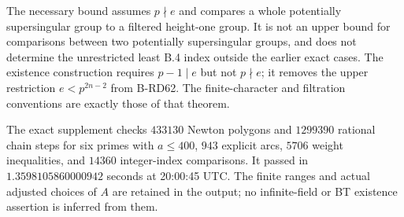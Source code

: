 \begin{remark}
\label{rem:B-RD63-scope}
The necessary bound assumes $p\nmid e$ and compares a whole
potentially supersingular group to a filtered height-one group.
It is not an upper bound for comparisons between two potentially
supersingular groups, and does not determine the unrestricted
least B.4 index outside the earlier exact cases. The existence
construction requires $p-1\mid e$ but not $p\nmid e$; it removes
the upper restriction $e<p^{2n-2}$ from B-RD62. The finite-character
and filtration conventions are exactly those of that theorem.

The exact supplement
checks $433130$ Newton polygons and $1299390$ rational chain steps
for six primes with $a\le400$, $943$ explicit arcs, $5706$ weight
inequalities, and $14360$ integer-index comparisons. It passed in
$1.3598105860000942$ seconds at 20:00:45 UTC. The finite ranges
and actual adjusted choices of $A$ are retained in the output;
no infinite-field or BT existence assertion is inferred from them.
\end{remark}
